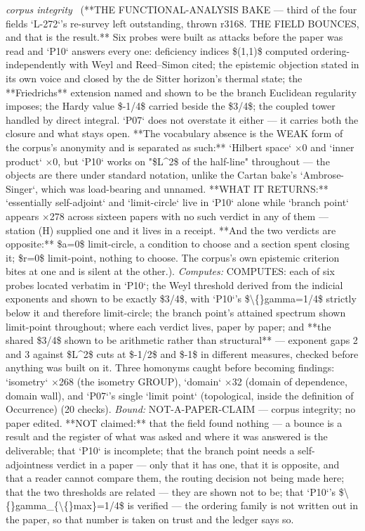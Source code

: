 \begin{description}
\textit{corpus integrity} \ (**THE FUNCTIONAL-ANALYSIS BAKE --- third of the four fields `L-272`'s re-survey left outstanding, thrown r3168. THE FIELD BOUNCES, and that is the result.** Six probes were built as attacks before the paper was read and `P10` answers every one: deficiency indices \$(1,1)\$ computed ordering-independently with Weyl and Reed--Simon cited; the epistemic objection stated in its own voice and closed by the de Sitter horizon's thermal state; the **Friedrichs** extension named and shown to be the branch Euclidean regularity imposes; the Hardy value \$-1/4\$ carried beside the \$3/4\$; the coupled tower handled by direct integral. `P07` does not overstate it either --- it carries both the closure and what stays open. **The vocabulary absence is the WEAK form of the corpus's anonymity and is separated as such:** `Hilbert space` \ensuremath{\times}0 and `inner product` \ensuremath{\times}0, but `P10` works on "\$L\textasciicircum{}2\$ of the half-line" throughout --- the objects are there under standard notation, unlike the Cartan bake's `Ambrose-Singer`, which was load-bearing and unnamed. **WHAT IT RETURNS:** `essentially self-adjoint` and `limit-circle` live in `P10` alone while `branch point` appears \ensuremath{\times}278 across sixteen papers with no such verdict in any of them --- station (H) supplied one and it lives in a receipt. **And the two verdicts are opposite:** \$a=0\$ limit-circle, a condition to choose and a section spent closing it; \$r=0\$ limit-point, nothing to choose. The corpus's own epistemic criterion bites at one and is silent at the other.). 
\emph{Computes:} COMPUTES: each of six probes located verbatim in `P10`; the Weyl threshold derived from the indicial exponents and shown to be exactly \$3/4\$, with `P10`'s \$\textbackslash\{\}gamma=1/4\$ strictly below it and therefore limit-circle; the branch point's attained spectrum shown limit-point throughout; where each verdict lives, paper by paper; and **the shared \$3/4\$ shown to be arithmetic rather than structural** --- exponent gaps 2 and 3 against \$L\textasciicircum{}2\$ cuts at \$-1/2\$ and \$-1\$ in different measures, checked before anything was built on it. Three homonyms caught before becoming findings: `isometry` \ensuremath{\times}268 (the isometry GROUP), `domain` \ensuremath{\times}32 (domain of dependence, domain wall), and `P07`'s single `limit point` (topological, inside the definition of Occurrence) (20 checks).
 \emph{Bound:} NOT-A-PAPER-CLAIM --- corpus integrity; no paper edited. **NOT claimed:** that the field found nothing --- a bounce is a result and the register of what was asked and where it was answered is the deliverable; that `P10` is incomplete; that the branch point needs a self-adjointness verdict in a paper --- only that it has one, that it is opposite, and that a reader cannot compare them, the routing decision not being made here; that the two thresholds are related --- they are shown not to be; that `P10`'s \$\textbackslash\{\}gamma\_\{\textbackslash\{\}max\}=1/4\$ is verified --- the ordering family is not written out in the paper, so that number is taken on trust and the ledger says so.

\end{description}
